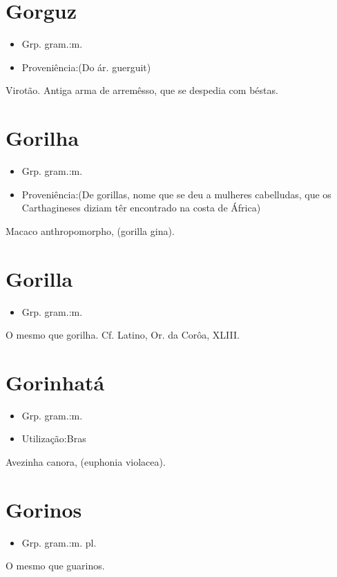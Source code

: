 \section{Gorguz}
\begin{itemize}
\item {Grp. gram.:m.}
\end{itemize}
\begin{itemize}
\item {Proveniência:(Do ár. \textunderscore guerguit\textunderscore )}
\end{itemize}
Virotão.
Antiga arma de arremêsso, que se despedia com béstas.
\section{Gorilha}
\begin{itemize}
\item {Grp. gram.:m.}
\end{itemize}
\begin{itemize}
\item {Proveniência:(De \textunderscore gorillas\textunderscore , nome que se deu a mulheres cabelludas, que os Carthagineses diziam têr encontrado na costa de África)}
\end{itemize}
Macaco anthropomorpho, (\textunderscore gorilla gina\textunderscore ).
\section{Gorilla}
\begin{itemize}
\item {Grp. gram.:m.}
\end{itemize}
O mesmo que gorilha. Cf. Latino, \textunderscore Or. da Corôa\textunderscore , XLIII.
\section{Gorinhatá}
\begin{itemize}
\item {Grp. gram.:m.}
\end{itemize}
\begin{itemize}
\item {Utilização:Bras}
\end{itemize}
Avezinha canora, (\textunderscore euphonia violacea\textunderscore ).
\section{Gorinos}
\begin{itemize}
\item {Grp. gram.:m. pl.}
\end{itemize}
O mesmo que \textunderscore guarinos\textunderscore .
